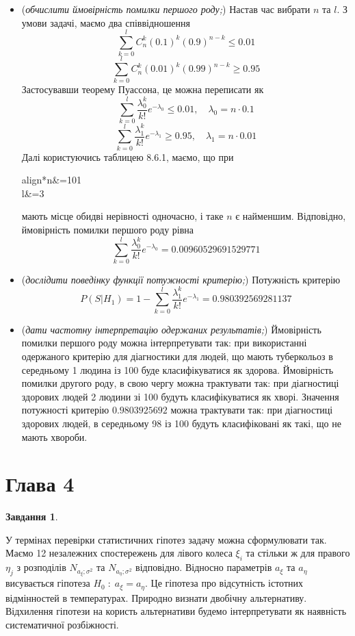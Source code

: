 \documentclass[12pt]{article} %
\newtheorem{prob}{Завдання}
\begin{document}
\begin{itemize}
		\item (\textit{обчислити ймовірність помилки першого роду;})
			Настав час вибрати $n$ та $l$. З умови задачі, маємо два співвідношення
			\[\sum_{k=0}^lC_n^k(0.1)^k(0.9)^{n-k}\leq0.01\]
			\[\sum_{k=0}^lC_n^k(0.01)^k(0.99)^{n-k}\geq0.95\]
			Застосувавши теорему Пуассона, це можна переписати як
			\[\sum_{k=0}^l\frac{\lambda_0^k}{k!}e^{-\lambda_0}\leq0.01,\quad\lambda_0=n\cdot0.1\]
			\[\sum_{k=0}^l\frac{\lambda_1^k}{k!}e^{-\lambda_1}\geq0.95,\quad\lambda_1=n\cdot0.01\]
			Далі користуючись таблицею 8.6.1, маємо, що при 
			\begin{empheq}[box=\fbox]{align*}n&=101\\l&=3\end{empheq}
			мають місце обидві нерівності одночасно, і таке $n$ є найменшим. Відповідно, ймовірність помилки першого роду рівна
			\[\sum_{k=0}^l\frac{\lambda_0^k}{k!}e^{-\lambda_0}=0.00960529691529771\]
		\item (\textit{дослідити поведінку функції потужності критерію;})
			Потужність критерію
			\[P(S\big|H_1)=1-\sum_{k=0}^l\frac{\lambda_1^k}{k!}e^{-\lambda_1}=0.980392569281137\]
		\item (\textit{дати частотну інтерпретацію одержаних результатів;})
			Ймовірність помилки першого роду можна інтерпретувати так: при використанні одержаного критерію для діагностики для людей,
			що мають туберкольоз в середньому 1 людина із 100 буде класифікуватися як здорова.
			Ймовірність помилки другого роду, в свою чергу можна трактувати так: при діагностиці здорових людей
			2 людини зі 100 будуть класифікуватися як хворі. Значення
			потужності критерію $0.9803925692$ можна трактувати так: при діагностиці здорових людей, в середньому 98 із 100 будуть
			класифіковані як такі, що не мають хвороби.
	\end{itemize}
\section{Глава 4}
\setcounter{prob}{30}
\begin{prob}\end{prob}
	У термінах перевірки статистичних гіпотез задачу можна сформулювати так. Маємо 12 незалежних спостережень для лівого колеса $\xi_i$
	та стільки ж для правого $\eta_j$ з розподілів $N_{a_\xi;\sigma^2}$ та $N_{a_\eta;\sigma^2}$ відповідно. Відносно параметрів
	$a_\xi$ та $a_\eta$ висувається гіпотеза $H_0\;:\;a_\xi=a_\eta$. Це гіпотеза про відсутність істотних відмінностей в температурах.
	Природно визнати двобічну альтернативу. Відхилення гіпотези на користь альтернативи будемо інтерпретувати як наявність систематичної 
	розбіжності.
\end{document}
